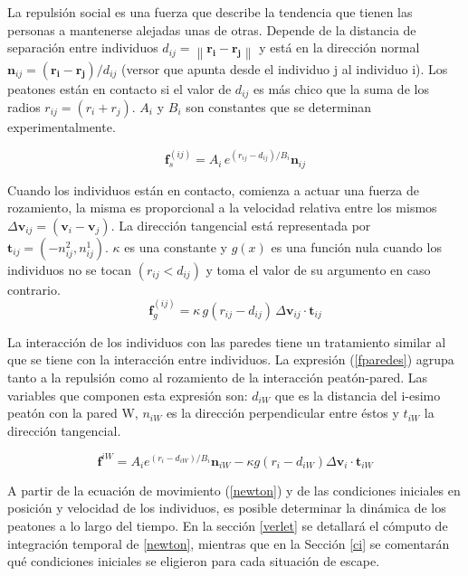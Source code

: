 La repulsión social es una fuerza que describe la tendencia que tienen las personas a mantenerse alejadas unas de otras. Depende de la distancia de separación entre individuos $d_{ij}=\left\|\mathbf{r_i}-\mathbf{r_j}\right\|$ y está en la dirección normal $\mathbf{n}_{ij}=(\mathbf{r_i}-\mathbf{r_j})/d_{ij}$ (versor que apunta desde el individuo j al individuo i). Los peatones están en contacto si el valor de $d_{ij}$ es más chico que la suma de los radios $r_{ij}=(r_i+r_j)$. $A_i$ y 	$B_i$ son constantes que se determinan experimentalmente.

\begin{equation}
\mathbf{f}_s^{(ij)}=A_i\,e^{(r_{ij}-d_{ij})/B_i}\mathbf{n}_{ij}\label{fsocial}
\end{equation} 

Cuando los individuos están en contacto, comienza a actuar una fuerza de rozamiento, la misma es proporcional a la velocidad relativa entre los mismos $\Delta \mathbf{v}_{ij}=(\mathbf{v}_i-\mathbf{v}_j)$. La dirección tangencial está representada por $\mathbf{t}_{ij}=(-n_{ij}^2,n_{ij}^1)$.  $\kappa$ es una constante y $g(x)$ es una función nula cuando los individuos no se tocan $(r_{ij}<d_{ij})$ y toma el valor de su argumento en caso contrario. 
\begin{equation}
\mathbf{f}_g^{(ij)}=\kappa\,g(r_{ij}-d_{ij})\,\Delta \mathbf{v}_{ij}\cdot\mathbf{t}_{ij}\label{frozamiento}
\end{equation}

La interacción de los individuos con las paredes tiene un tratamiento similar al que se tiene con la interacción entre individuos. La expresión (\ref{fparedes}) agrupa tanto a la repulsión como al rozamiento de la interacción peatón-pared. Las variables que componen esta expresión son: $d_{iW}$ que es la distancia del i-esimo peatón con la pared W, $n_{iW}$ es la dirección perpendicular entre éstos y $t_{iW}$ la dirección tangencial.

\begin{equation}
\mathbf{f}^{iW}=A_ie^{(r_{i}-d_{iW})/B_i}\mathbf{n}_{iW}-\kappa g(r_{i}-d_{iW})\Delta \mathbf{v}_{i}\cdot\mathbf{t}_{iW}
\label{fparedes}
\end{equation} 

A partir de la ecuación de movimiento (\ref{newton}) y de las condiciones iniciales en posición y velocidad de los individuos, es posible determinar la dinámica de los peatones a lo largo del tiempo. En la sección \ref{verlet} se detallará el cómputo de integración temporal de \ref{newton}, mientras que en la Sección \ref{ci} se comentarán qué condiciones iniciales se eligieron para cada situación de escape. 


